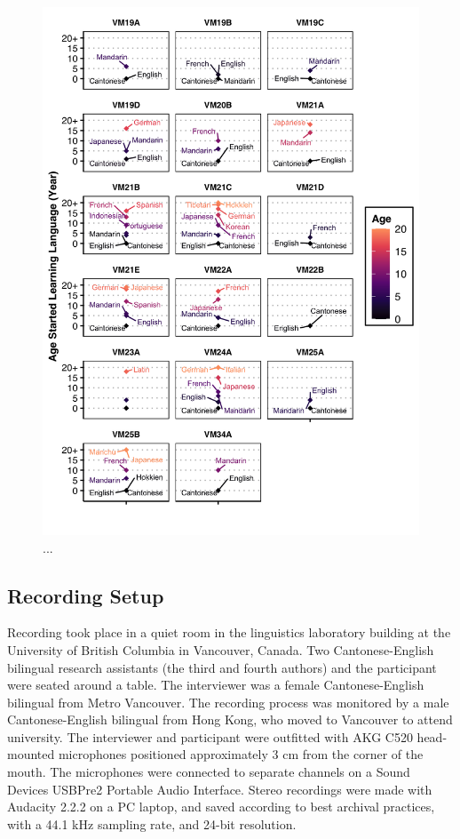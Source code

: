 \begin{figure}[!htbp]
  \begin{center}
  \includegraphics[width=4.9in]{figures/ch2_multilingualism_vm_5in.png} 
  \caption{...}
  \label{ch2:fig:multilingualism_vm}
  \end{center}
\end{figure}

\subsection{Recording Setup}\label{ch2:subsec:setup}
Recording took place in a quiet room in the linguistics laboratory building at the University of British Columbia in Vancouver, Canada. Two Cantonese-English bilingual research assistants (the third and fourth authors) and the participant were seated around a table. The interviewer was a female Cantonese-English bilingual from Metro Vancouver. The recording process was monitored by a male Cantonese-English bilingual from Hong Kong, who moved to Vancouver to attend university. The interviewer and participant were outfitted with AKG C520 head-mounted microphones positioned approximately 3 cm from the corner of the mouth. The microphones were connected to separate channels on a Sound Devices USBPre2 Portable Audio Interface. Stereo recordings were made with Audacity 2.2.2 \citep{audacity_2018_audio} on a PC laptop, and saved according to best archival practices, with a 44.1 kHz sampling rate, and 24-bit resolution.

